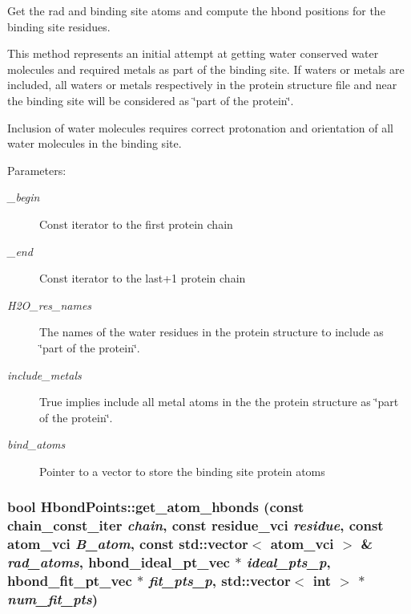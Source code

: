 Get the rad and binding site atoms and compute the hbond positions for the binding site residues.

This method represents an initial attempt at getting water conserved water molecules and required metals as part of the binding site. If waters or metals are included, all waters or metals respectively in the protein structure file and near the binding site will be considered as \char`\"{}part of the protein\char`\"{}.

Inclusion of water molecules requires correct protonation and orientation of all water molecules in the binding site.

\begin{Desc}
\item[Parameters:]
\begin{description}
\item[{\em \_\-begin}]Const iterator to the first protein chain \item[{\em \_\-end}]Const iterator to the last+1 protein chain \item[{\em H2O\_\-res\_\-names}]The names of the water residues in the protein structure to include as \char`\"{}part of the protein\char`\"{}. \item[{\em include\_\-metals}]True implies include all metal atoms in the the protein structure as \char`\"{}part of the protein\char`\"{}. \item[{\em bind\_\-atoms}]Pointer to a vector to store the binding site protein atoms \end{description}
\end{Desc}
\subsubsection{\setlength{\rightskip}{0pt plus 5cm}bool Hbond\-Points::get\_\-atom\_\-hbonds (const chain\_\-const\_\-iter {\em chain}, const residue\_\-vci {\em residue}, const atom\_\-vci {\em B\_\-atom}, const std::vector$<$ atom\_\-vci $>$ \& {\em rad\_\-atoms}, \bf{hbond\_\-ideal\_\-pt\_\-vec} $\ast$ {\em ideal\_\-pts\_\-p}, \bf{hbond\_\-fit\_\-pt\_\-vec} $\ast$ {\em fit\_\-pts\_\-p}, std::vector$<$ int $>$ $\ast$ {\em num\_\-fit\_\-pts})\hspace{0.3cm}{\tt  [private]}}\label{classSimSite3D_1_1HbondPoints_097c5b40240e8c09fe3bbb18fde8f373}


